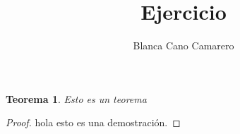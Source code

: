 \documentclass{article}
\title{Ejercicio }
\author{Blanca Cano Camarero}
\newtheorem*{teorema*}{Teorema}
\begin{document}
\maketitle

\begin{teorema*}
    Esto es un teorema
\end{teorema*}   

\begin{proof}
    hola esto es una demostración.
\end{proof}
\end{document}
